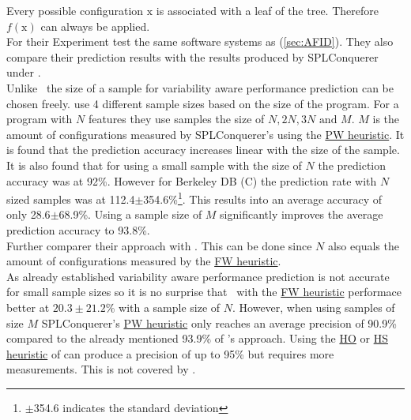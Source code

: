 Every possible configuration $\mathrm{x}$ is associated with a leaf of the tree. Therefore $f(\mathrm{x})$ can always be applied.\\
For their Experiment \citet{VariabilityAwarePerformancePredictionJianmeiSigmundApel} test the same software systems as \citet{AutomatedFeatureDetectionSiegmund2012} (\cref{sec:AFID}). They also compare their prediction results with the results produced by SPLConquerer under \AFID.\\
Unlike \AFID~the size of a sample for variability aware performance prediction can be chosen freely. \citet{VariabilityAwarePerformancePredictionJianmeiSigmundApel} use 4 different sample sizes based on the size of the program. For a program with $N$ features they use samples the size of $N,2N,3N \text{ and } M$. $M$ is the amount of configurations measured by SPLConquerer's using the \hyperref[lab:PW]{PW heuristic}.
It is found that the prediction accuracy increases linear with the size of the sample. It is also found that for using a small sample with the size of $N$ the prediction accuracy was at 92\%. However for Berkeley DB (C) the prediction rate with $N$ sized samples was at 112.4$\pm$354.6\%\footnote{$\pm$354.6 indicates the standard deviation}. This results into an average accuracy of only 28.6$\pm$68.9\%. Using a sample size of $M$ significantly improves the average prediction accuracy to 93.8\%.\\
Further \citet{VariabilityAwarePerformancePredictionJianmeiSigmundApel} comparer their approach with \AFID. This can be done since $N$ also equals the amount of configurations measured by the \hyperref[lab:FW]{FW heuristic}.\\
As already established variability aware performance prediction is not accurate for small sample sizes so it is no surprise that \AFID~with the \hyperref[lab:FW]{FW heuristic} performace better at $20.3\pm21.2$\% with a sample size of $N$. However, when using samples of size $M$ SPLConquerer's \hyperref[lab:PW]{PW heuristic} only reaches an average precision of 90.9\% compared to the already mentioned 93.9\% of \citet{VariabilityAwarePerformancePredictionJianmeiSigmundApel}'s approach.
Using the \hyperref[lab:HO]{HO} or \hyperref[lab:HS]{HS heuristic} of \AFID can produce a precision of up to 95\% but requires more measurements. This is not covered by \cite{VariabilityAwarePerformancePredictionJianmeiSigmundApel}.
